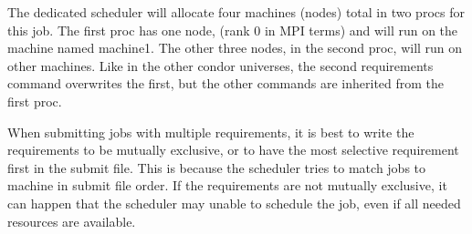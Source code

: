 The dedicated scheduler will allocate four machines (nodes) total in 
two procs for this job.  The first proc has one node, (rank 0 
in MPI terms) and will run on the machine named machine1.  The 
other three nodes, in the second proc, will run on other machines.  
Like in the other condor universes, the second requirements command 
overwrites the first, but the other commands are inherited from the 
first proc.

When submitting jobs with multiple requirements, it is
best to write the requirements to be mutually exclusive,
or to have the most selective requirement first in the submit file.
This is because the scheduler tries to match jobs to machine in
submit file order.  If the requirements are not mutually exclusive,
it can happen that the scheduler may unable to schedule the job, even
if all needed resources are available.

